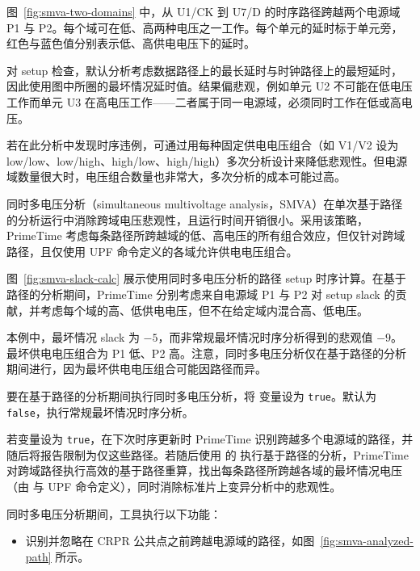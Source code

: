 图~\ref{fig:smva-two-domains} 中，从 U1/CK 到 U7/D 的时序路径跨越两个电源域 P1 与 P2。每个域可在低、高两种电压之一工作。每个单元的延时标于单元旁，红色与蓝色值分别表示低、高供电电压下的延时。


对 setup 检查，默认分析考虑数据路径上的最长延时与时钟路径上的最短延时，因此使用图中所圈的最坏情况延时值。结果偏悲观，例如单元 U2 不可能在低电压工作而单元 U3 在高电压工作——二者属于同一电源域，必须同时工作在低或高电压。

若在此分析中发现时序违例，可通过用每种固定供电电压组合（如 V1/V2 设为 low/low、low/high、high/low、high/high）多次分析设计来降低悲观性。但电源域数量很大时，电压组合数量也非常大，多次分析的成本可能过高。

同时多电压分析（simultaneous multivoltage analysis，SMVA）在单次基于路径的分析运行中消除跨域电压悲观性，且运行时间开销很小。采用该策略，PrimeTime 考虑每条路径所跨越域的低、高电压的所有组合效应，但仅针对跨域路径，且仅使用 UPF 命令定义的各域允许供电电压组合。

图~\ref{fig:smva-slack-calc} 展示使用同时多电压分析的路径 setup 时序计算。在基于路径的分析期间，PrimeTime 分别考虑来自电源域 P1 与 P2 对 setup slack 的贡献，并考虑每个域的高、低供电电压，但不在给定域内混合高、低电压。


本例中，最坏情况 slack 为 $-5$，而非常规最坏情况时序分析得到的悲观值 $-9$。最坏供电电压组合为 P1 低、P2 高。注意，同时多电压分析仅在基于路径的分析期间进行，因为最坏供电电压组合可能因路径而异。

要在基于路径的分析期间执行同时多电压分析，将  变量设为 \texttt{true}。默认为 \texttt{false}，执行常规最坏情况时序分析。

若变量设为 \texttt{true}，在下次时序更新时 PrimeTime 识别跨越多个电源域的路径，并随后将报告限制为仅这些路径。若随后使用  的  执行基于路径的分析，PrimeTime 对跨域路径执行高效的基于路径重算，找出每条路径所跨越各域的最坏情况电压（由  与 UPF 命令定义），同时消除标准片上变异分析中的悲观性。

同时多电压分析期间，工具执行以下功能：
\begin{itemize}
  \item 识别并忽略在 CRPR 公共点之前跨越电源域的路径，如图~\ref{fig:smva-analyzed-path} 所示。
\end{itemize}

